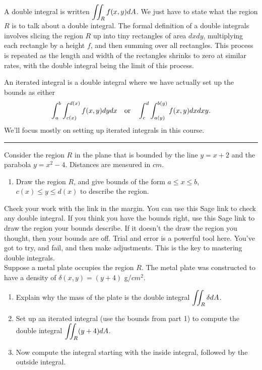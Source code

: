 \begin{definition}
A double integral is written $\displaystyle \iint_R f(x,y)dA$.  We just have to state what the region $R$ is to talk about a double integral. The formal definition of a double integrals involves slicing the region $R$ up into tiny rectangles of area $dxdy$, multiplying each rectangle by a height $f$, and then summing over all rectangles. This process is repeated as the length and width of the rectangles shrinks to zero at similar rates, with the double integral being the limit of this process. 

An iterated integral is a double integral where we have actually set up 
the bounds as either 
$$\displaystyle \int_a^b \int_{c(x)}^{d(x)}f(x,y)dydx \quad \text{or} \quad
\displaystyle \int_c^d \int_{a(y)}^{b(y)}f(x,y)dxdxy.$$
We'll focus mostly on setting up iterated integrals in this course. 
\end{definition}

\vskip0.1in
\hrule
\vskip0.1in

%
%

\begin{problem}
Consider the region $R$ in the plane that is bounded by the line $y=x+2$ and the parabola $y=x^2-4$. Distances are measured in $cm$. 
\begin{enumerate}
 \item Draw the region $R$, and give bounds of the form $a\leq x\leq b$, $c(x)\leq y\leq d(x)$ to describe the region.
\end{enumerate}
Check your work with the link in the margin. You can use this Sage link to check any double integral. If you think you have the bounds right, use this Sage link to draw the region your bounds describe. If it doesn't the draw the region you thought, then your bounds are off. Trial and error is a powerful tool here.  You've got to try, and fail, and then make adjustments.  This is the key to mastering double integrals.\\

Suppose a metal plate occupies the region $R$. The metal plate was constructed to have a density of $\delta (x,y)=(y+4)$ g/$cm^2$.
\begin{enumerate}[resume]
	\item Explain why the mass of the plate is the double integral $\displaystyle\iint_R \delta dA$.  
	\item {}
Set up an iterated integral (use the bounds from part 1) to compute the double integral $\displaystyle\iint_R (y+4) dA$.
	\item Now compute the integral starting with the inside integral, followed by the outside integral. 
\end{enumerate}

\end{problem}


